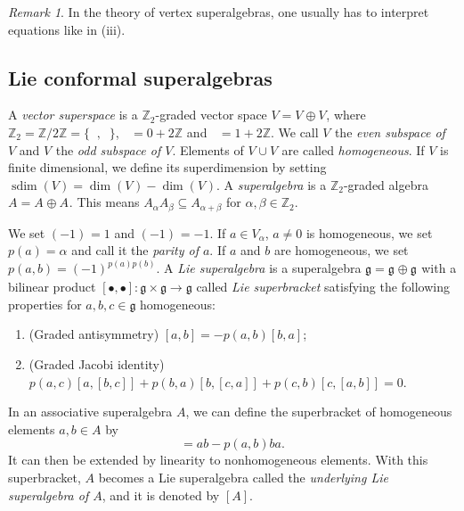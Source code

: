 \documentclass[a4paper, 12pt, reqno]{amsart}
\theoremstyle{remark}
\newtheorem{remark}[theorem]{Remark}
\DeclareMathOperator{\zero}{\overline{0}}
\DeclareMathOperator{\one}{\overline{1}}
\DeclareMathOperator{\sdim}{sdim}
\begin{document}
\begin{remark}
  \label{rmk:1}
  In the theory of vertex superalgebras, one usually has to interpret equations like in (iii).
\end{remark}

\subsection{Lie conformal superalgebras}
\label{sec:lie-conf-super}

A \emph{vector superspace} is a $\mathbb{Z}_2$-graded vector space $V = V_{\zero} \oplus V_{\one}$, where $\mathbb{Z}_2 = \mathbb{Z}/2\mathbb{Z} = \{\zero, \one\}$, $\zero = 0 + 2\mathbb{Z}$ and $\one = 1 + 2\mathbb{Z}$.
We call $V_{\zero}$ the \emph{even subspace of $V$} and $V_{\one}$ the \emph{odd subspace of $V$}.
Elements of $V_{\zero} \cup V_{\one}$ are called \emph{homogeneous}.
If $V$ is finite dimensional, we define its superdimension by setting $\sdim(V) = \dim(V_{\zero}) - \dim(V_{\one})$.
A \emph{superalgebra} is a $\mathbb{Z}_2$-graded algebra $A = A_{\zero} \oplus A_{\one}$.
This means $A_{\alpha}A_{\beta} \subseteq A_{\alpha + \beta}$ for $\alpha, \beta \in \mathbb{Z}_2$.

We set $(-1)^{\zero} = 1$ and $(-1)^{\one} = -1$.
If $a \in V_{\alpha}$, $a \neq 0$ is homogeneous, we set $p(a) = \alpha$ and call it the \emph{parity of $a$}.
If $a$ and $b$ are homogeneous, we set $p(a, b) = (-1)^{p(a)p(b)}$.
A \emph{Lie superalgebra} is a superalgebra $\mathfrak{g} = \mathfrak{g}_{\zero} \oplus \mathfrak{g}_{\one}$ with a bilinear product $[\bullet, \bullet]: \mathfrak{g} \times \mathfrak{g} \to \mathfrak{g}$ called \emph{Lie superbracket} satisfying the following properties for $a, b, c \in \mathfrak{g}$ homogeneous:
\begin{enumerate}
\item (Graded antisymmetry) $[a, b] = -p(a, b)[b, a]$;
\item (Graded Jacobi identity) $p(a, c)[a, [b, c]] + p(b, a)[b, [c, a]] + p(c, b)[c, [a, b]] = 0$.
\end{enumerate}

In an associative superalgebra $A$, we can define the superbracket of homogeneous elements $a, b \in A$ by
\begin{equation*}
  [a, b] = ab - p(a, b)ba.
\end{equation*}
It can then be extended by linearity to nonhomogeneous elements.
With this superbracket, $A$ becomes a Lie superalgebra called the \emph{underlying Lie superalgebra of $A$}, and it is denoted by $[A]$.
\end{document}
